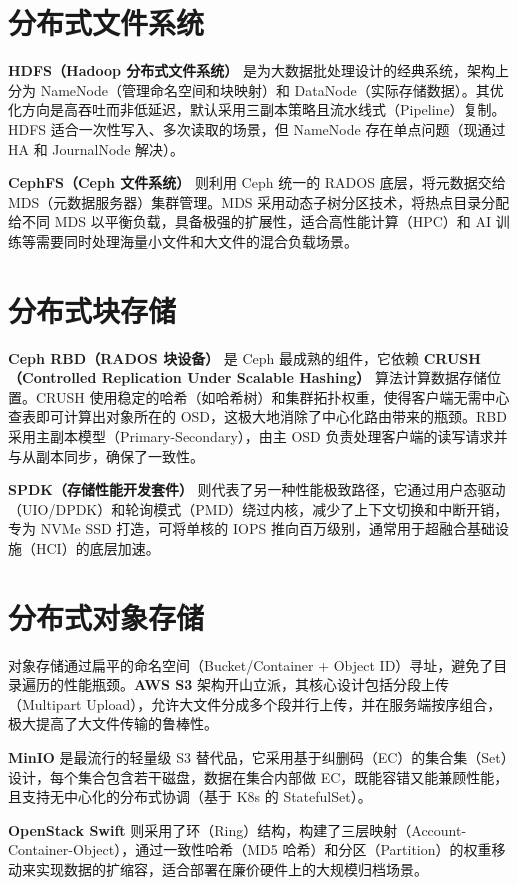 \documentclass[12pt,UTF8]{ctexbook}
\begin{document}
	\section{分布式文件系统}
	
	\textbf{HDFS（Hadoop 分布式文件系统）} 是为大数据批处理设计的经典系统，架构上分为 NameNode（管理命名空间和块映射）和 DataNode（实际存储数据）。其优化方向是高吞吐而非低延迟，默认采用三副本策略且流水线式（Pipeline）复制。HDFS 适合一次性写入、多次读取的场景，但 NameNode 存在单点问题（现通过 HA 和 JournalNode 解决）。
	
	\textbf{CephFS（Ceph 文件系统）} 则利用 Ceph 统一的 RADOS 底层，将元数据交给 MDS（元数据服务器）集群管理。MDS 采用动态子树分区技术，将热点目录分配给不同 MDS 以平衡负载，具备极强的扩展性，适合高性能计算（HPC）和 AI 训练等需要同时处理海量小文件和大文件的混合负载场景。
	
	\section{分布式块存储}
	
	\textbf{Ceph RBD（RADOS 块设备）} 是 Ceph 最成熟的组件，它依赖 \textbf{CRUSH（Controlled Replication Under Scalable Hashing）} 算法计算数据存储位置。CRUSH 使用稳定的哈希（如哈希树）和集群拓扑权重，使得客户端无需中心查表即可计算出对象所在的 OSD，这极大地消除了中心化路由带来的瓶颈。RBD 采用主副本模型（Primary-Secondary），由主 OSD 负责处理客户端的读写请求并与从副本同步，确保了一致性。
	
	\textbf{SPDK（存储性能开发套件）} 则代表了另一种性能极致路径，它通过用户态驱动（UIO/DPDK）和轮询模式（PMD）绕过内核，减少了上下文切换和中断开销，专为 NVMe SSD 打造，可将单核的 IOPS 推向百万级别，通常用于超融合基础设施（HCI）的底层加速。
	
	\section{分布式对象存储}
	
	对象存储通过扁平的命名空间（Bucket/Container + Object ID）寻址，避免了目录遍历的性能瓶颈。\textbf{AWS S3} 架构开山立派，其核心设计包括分段上传（Multipart Upload），允许大文件分成多个段并行上传，并在服务端按序组合，极大提高了大文件传输的鲁棒性。
	
	\textbf{MinIO} 是最流行的轻量级 S3 替代品，它采用基于纠删码（EC）的集合集（Set）设计，每个集合包含若干磁盘，数据在集合内部做 EC，既能容错又能兼顾性能，且支持无中心化的分布式协调（基于 K8s 的 StatefulSet）。
	
	\textbf{OpenStack Swift} 则采用了环（Ring）结构，构建了三层映射（Account-Container-Object），通过一致性哈希（MD5 哈希）和分区（Partition）的权重移动来实现数据的扩缩容，适合部署在廉价硬件上的大规模归档场景。
	
\end{document}
